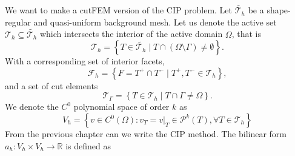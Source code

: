 We want to make a cutFEM version of the CIP problem. Let $\widetilde{\mathcal{T}_{h} } $ be a shape-regular and quasi-uniform background mesh. Let us denote the active set $\mathcal{T} _{h} \subseteq \widetilde{\mathcal{T}_{h}}$ which intersects the interior of the active domain $\Omega $, that is  \[
\mathcal{T} _{h} = \left\{ T \in \widetilde{\mathcal{T} _{h}}  \mid  T \cap (\Omega \setminus \Gamma ) \neq \emptyset    \right\} .
\]
With a corresponding set of interior facets, \[
    \mathcal{F} _{h} = \left\{ F = T^{+} \cap T^{-}  \mid  T^{+}, T^{-} \in \mathcal{T} _{h} \right\},
\]
and a set of cut elements \[
\mathcal{T} _{\Gamma } = \left\{ T \in \mathcal{T} _{h}   \mid  T \cap \Gamma \neq \Omega \right\}.
\]
We denote the $C^{0}$ polynomial space of order $k$ as
\[
V_{h} = \left\{ v \in C^{0}\left( \Omega  \right): v_{T} = v | _{T} \in \mathcal{P} ^{k}\left( T \right), \forall T \in
\mathcal{T}_{h}    \right\}
\]
From the previous chapter can we write the CIP method. The bilinear form $a_{h}:  V_{h}\times  V_{h} \to \mathbb{R} $ is defined as


